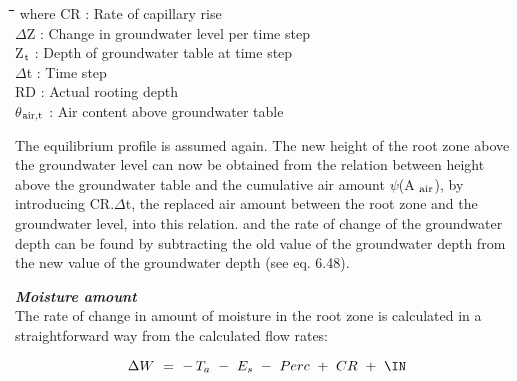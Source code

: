 \documentclass[11pt]{article}
\begin{document}
\nwln
\begin{tabbing}
\hspace{1.27cm}\=\hspace{1.27cm}\=\hspace{1.27cm}\=\hspace{1.27cm}\=%
\hspace{1.27cm}\=\hspace{1.27cm}\=\hspace{1.27cm}\=\hspace{1.27cm}\=%
\hspace{1.27cm}\=\hspace{1.27cm}\=\kill
where\> CR\> : Rate of capillary rise\> \> \> \> \> \> \> \> [cm d$^{{\rm -1}}$]\\
\>$\Delta$Z\> : Change in groundwater level per time step\> \> \> \> \> \> \> \> [cm d$^{{\rm -1}}$]\\
\>Z$_{{\rm t}}$\> : Depth of groundwater table at time step\> \> \> \> \> \> \> \> [cm d$^{{\rm -1}}$]\\
\>$\Delta$t\> : Time step\> \> \> \> \> \> \> \> [d]\\
\>RD\> : Actual rooting depth\> \> \> \> \> \> \> \> [cm]\\
\>$\theta$$_{{\rm air,t}}$\> : Air content above groundwater table\> \> \> \> \> \> \> \> [cm$^{{\rm 3}}$ cm$^{{\rm -3}}$]
\end{tabbing}

\bigskip
\bigskip
The equilibrium profile is assumed again. The new height of the root zone above the
groundwater level can now be obtained from the relation between height above the
groundwater table and the cumulative air amount $\psi$(A $_{{\rm air}}$), by introducing CR.$\Delta$t, the
replaced air amount between the root zone and the groundwater level, into this relation.
and the rate of change of the groundwater depth can be found by subtracting the old value
of the groundwater depth from the new value of the groundwater depth (see eq. 6.48). 

\bigskip
\bigskip
\bigskip
 {\bf {\it Moisture amount\/}}\\
The rate of change in amount of moisture in the root zone is calculated in a straightfor\-ward way from the calculated flow rates:

\begin{displaymath}
\Delta W ~=~ -\, T _{a} ~-~ E _{s} ~-~ Perc ~+~ CR ~+~ \IN
\end{displaymath}
\end{document}
